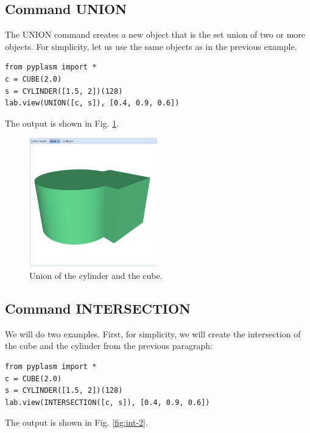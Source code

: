 \documentclass{article}
\begin{document}
\subsection{Command UNION}

The UNION command creates a new object that is the set union 
of two or more objects. For simplicity, let us use the same objects
as in the previous example. 

\begin{verbatim}
from pyplasm import *
c = CUBE(2.0)
s = CYLINDER([1.5, 2])(128)
lab.view(UNION([c, s]), [0.4, 0.9, 0.6]) 
\end{verbatim}
The output is shown in Fig. \ref{fig:union}.


\begin{figure}[!ht]
\begin{center}
\includegraphics[width=0.5\textwidth]{img/union.png}
\end{center}
\vspace{-2mm}
\caption{Union of the cylinder and the cube.}
\label{fig:union}
\end{figure}


\subsection{Command INTERSECTION}

We will do two examples. First, for simplicity, we will create the intersection
of the cube and the cylinder from the previous paragraph:
 
\begin{verbatim}
from pyplasm import *
c = CUBE(2.0)
s = CYLINDER([1.5, 2])(128)
lab.view(INTERSECTION([c, s]), [0.4, 0.9, 0.6]) 
\end{verbatim}
The output is shown in Fig. \ref{fig:int-2}.
\end{document}

